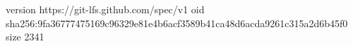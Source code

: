 version https://git-lfs.github.com/spec/v1
oid sha256:9fa36777475169c96329e81e4b6acf3589b41ca48d6acda9261c315a2d6b45f0
size 2341
